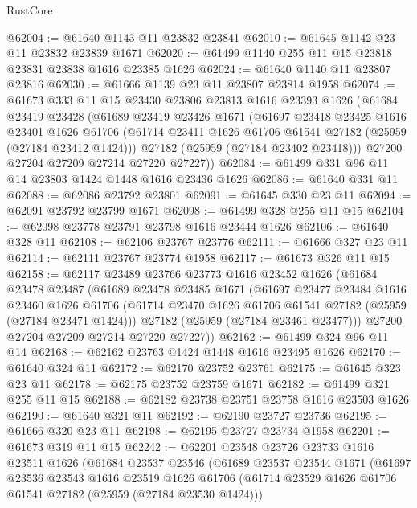 \begin{lexlean}{RustCore}
\begin{coremodule}
@62004 := @61640 @1143 @11 @23832 @23841
@62010 := @61645 @1142 @23 @11 @23832 @23839 @1671
@62020 := @61499 @1140 @255 @11 @15 @23818 @23831 @23838 @1616 @23385 @1626
@62024 := @61640 @1140 @11 @23807 @23816
@62030 := @61666 @1139 @23 @11 @23807 @23814 @1958
@62074 := @61673
    @333
    @11
    @15
    @23430
    @23806
    @23813
    @1616
    @23393
    @1626
    (@61684
      @23419
      @23428
      (@61689
        @23419
        @23426
        @1671
        (@61697
          @23418
          @23425
          @1616
          @23401
          @1626
          @61706
          (@61714 @23411 @1626 @61706 @61541 @27182 (@25959 (@27184 @23412 @1424)))
          @27182
          (@25959 (@27184 @23402 @23418)))
        @27200
        @27204
        @27209
        @27214
        @27220
        @27227))
@62084 := @61499 @331 @96 @11 @14 @23803 @1424 @1448 @1616 @23436 @1626
@62086 := @61640 @331 @11
@62088 := @62086 @23792 @23801
@62091 := @61645 @330 @23 @11
@62094 := @62091 @23792 @23799 @1671
@62098 := @61499 @328 @255 @11 @15
@62104 := @62098 @23778 @23791 @23798 @1616 @23444 @1626
@62106 := @61640 @328 @11
@62108 := @62106 @23767 @23776
@62111 := @61666 @327 @23 @11
@62114 := @62111 @23767 @23774 @1958
@62117 := @61673 @326 @11 @15
@62158 := @62117
    @23489
    @23766
    @23773
    @1616
    @23452
    @1626
    (@61684
      @23478
      @23487
      (@61689
        @23478
        @23485
        @1671
        (@61697
          @23477
          @23484
          @1616
          @23460
          @1626
          @61706
          (@61714 @23470 @1626 @61706 @61541 @27182 (@25959 (@27184 @23471 @1424)))
          @27182
          (@25959 (@27184 @23461 @23477)))
        @27200
        @27204
        @27209
        @27214
        @27220
        @27227))
@62162 := @61499 @324 @96 @11 @14
@62168 := @62162 @23763 @1424 @1448 @1616 @23495 @1626
@62170 := @61640 @324 @11
@62172 := @62170 @23752 @23761
@62175 := @61645 @323 @23 @11
@62178 := @62175 @23752 @23759 @1671
@62182 := @61499 @321 @255 @11 @15
@62188 := @62182 @23738 @23751 @23758 @1616 @23503 @1626
@62190 := @61640 @321 @11
@62192 := @62190 @23727 @23736
@62195 := @61666 @320 @23 @11
@62198 := @62195 @23727 @23734 @1958
@62201 := @61673 @319 @11 @15
@62242 := @62201
    @23548
    @23726
    @23733
    @1616
    @23511
    @1626
    (@61684
      @23537
      @23546
      (@61689
        @23537
        @23544
        @1671
        (@61697
          @23536
          @23543
          @1616
          @23519
          @1626
          @61706
          (@61714 @23529 @1626 @61706 @61541 @27182 (@25959 (@27184 @23530 @1424)))

\end{coremodule}
\end{lexlean}

